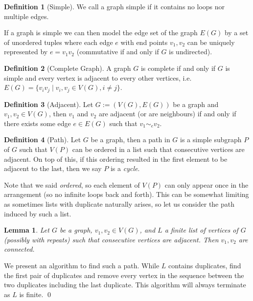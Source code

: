 \documentclass[
]{article}
\newtheorem{lemma}{Lemma}
\theoremstyle{definition}
\newtheorem{definition}{Definition}[section]
\begin{document}
\begin{definition}[Simple]
  We call a graph simple if it contains no loops nor multiple edges.
\end{definition}

If a graph is simple we can then model the edge set of the graph
\(E(G)\) by a set of unordered tuples where each edge \(e\) with end
points \(v_1, v_2\) can be uniquely represented by \(e = v_1 v_2\)
(commutative if and only if \(G\) is undirected).

\begin{definition}[Complete Graph]
  A graph \(G\) is complete if and only if \(G\) is simple and every vertex is 
  adjacent to every other vertices, i.e. 
  \(E(G) = \{v_i v_j \mid v_i, v_j \in V(G), i \neq j \}\).
\end{definition}

\begin{definition}[Adjacent]
  Let \(G := (V(G), E(G))\) be a graph and \(v_1, v_2 \in V(G)\), then \(v_1\) 
  and \(v_2\) are adjacent (or are neighbours) if and only if there exists some 
  edge \(e \in E(G)\) such that \(v_1 \sim_e v_2\).
\end{definition}

\begin{definition}[Path]
  Let \(G\) be a graph, then a path in \(G\) is a simple subgraph \(P\) of \(G\) 
  such that \(V(P)\) can be ordered in a list such that consecutive vertices are 
  adjacent. On top of this, if this ordering resulted in the first element to be 
  adjacent to the last, then we say \(P\) is a \textit{cycle}.
\end{definition}

Note that we said \emph{ordered}, so each element of \(V(P)\) can only
appear once in the arrangement (so no infinite loops back and forth).
This can be somewhat limiting as sometimes lists with duplicate
naturally arises, so let us consider the path induced by such a list.

\begin{lemma}\label{mk_path}
  Let \(G\) be a graph, \(v_1, v_2 \in V(G)\), and \(L\) a finite list of 
  vertices of \(G\) (possibly with repeats) such that consecutive vertices are 
  adjacent. Then \(v_1, v_2\) are connected.
\end{lemma}
\proof

We present an algorithm to find such a path. While \(L\) contains
duplicates, find the first pair of duplicates and remove every vertex in
the sequence between the two duplicates including the last duplicate.
This algorithm will always terminate as \(L\) is finite. \qed
\end{document}
